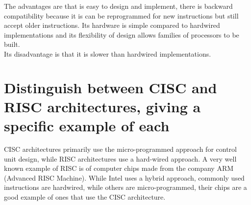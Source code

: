 \documentclass{article}
\begin{document}
The advantages are that is easy to design and implement, there is backward
compatibility because it is can be reprogrammed for new instructions but still
accept older instructions. Its hardware is simple compared to hardwired
implementations and its flexibility of design allows families of processors to
be built. \\
Its disadvantage is that it is slower than hardwired implementations.

\section{Distinguish between CISC and RISC architectures, giving a specific example of each}

CISC architectures primarily use the micro-programmed approach for control unit
design, while RISC architectures use a hard-wired approach. A very well known
example of RISC is of computer chips made from the company ARM (Advanced RISC
Machine). While Intel uses a hybrid approach, commonly used instructions are
hardwired, while others are micro-programmed, their chips are a good example of
ones that use the CISC architecture.
\end{document}
